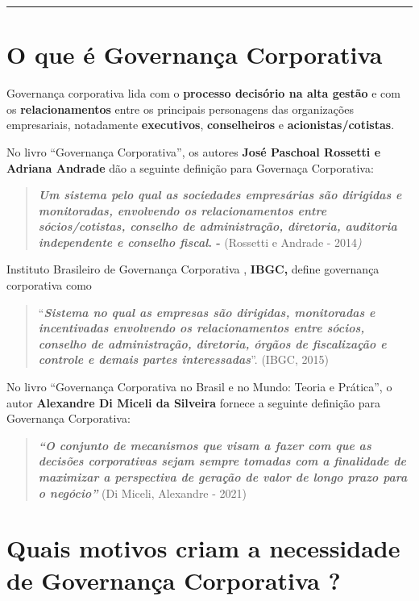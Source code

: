 \documentclass[
]{book}
\begin{document}
\begin{center}\rule{0.5\linewidth}{0.5pt}\end{center}

\section{O que é Governança Corporativa}\label{o-que-uxe9-governanuxe7a-corporativa}

Governança corporativa lida com o \textbf{processo decisório na alta gestão} e com os \textbf{relacionamentos} entre os principais personagens das organizações empresariais, notadamente \textbf{executivos}, \textbf{conselheiros} e \textbf{acionistas/cotistas}.

No livro ``Governança Corporativa'', os autores \textbf{José Paschoal Rossetti e Adriana Andrade} dão a seguinte definição para Governaça Corporativa:

\begin{quote}
\textbf{\emph{Um sistema pelo qual as sociedades empresárias são dirigidas e monitoradas, envolvendo os relacionamentos entre sócios/cotistas, conselho de administração, diretoria, auditoria independente e conselho fiscal}. -} (Rossetti e Andrade - 2014\emph{)}
\end{quote}

Instituto Brasileiro de Governança Corporativa , \textbf{IBGC,} define governança corporativa como

\begin{quote}
``\textbf{\emph{Sistema no qual as empresas são dirigidas, monitoradas e incentivadas envolvendo os relacionamentos entre sócios, conselho de administração, diretoria, órgãos de fiscalização e controle e demais partes interessadas}}''. (IBGC, 2015)
\end{quote}

No livro ``Governança Corporativa no Brasil e no Mundo: Teoria e Prática'', o autor \textbf{Alexandre Di Miceli da Silveira} fornece a seguinte definição para Governança Corporativa:

\begin{quote}
\textbf{\emph{``O conjunto de mecanismos que visam a fazer com que as decisões corporativas sejam sempre tomadas com a finalidade de maximizar a perspectiva de geração de valor de longo prazo para o negócio''}} (Di Miceli, Alexandre - 2021)
\end{quote}

\section{Quais motivos criam a necessidade de Governança Corporativa ?}\label{quais-motivos-criam-a-necessidade-de-governanuxe7a-corporativa}
\end{document}
